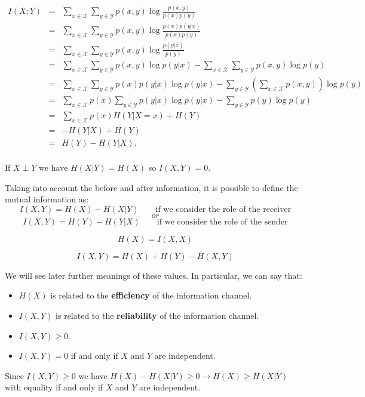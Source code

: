 \begin{equation*}
    \begin{array}{rcl}
    	I(X;Y) & = & \sum_{x \in \mathcal{X}} \sum_{y \in \mathcal{Y}} p(x,y) \log \frac{p(x,y)}{p(x)p(y)}\\[8pt]
    	& = & \sum_{x \in \mathcal{X}} \sum_{y \in \mathcal{Y}} p(x,y) \log \frac{p(x)p(y|x)}{p(x)p(y)}\\[8pt]
    	& = & \sum_{x \in \mathcal{X}} \sum_{y \in \mathcal{Y}} p(x,y) \log \frac{p(y|x)}{p(y)}\\[8pt]
    	& = & \sum_{x \in \mathcal{X}} \sum_{y \in \mathcal{Y}} p(x,y) \log{p(y|x)} - \sum_{x \in \mathcal{X}} \sum_{y \in \mathcal{Y}} p(x,y)\log{p(y)}\\[8pt]
    	& = & \sum_{x \in \mathcal{X}} \sum_{y \in \mathcal{Y}} p(x)p(y|x) \log{p(y|x)} - \sum_{y \in \mathcal{Y}} \left(\sum_{x \in \mathcal{X}} p(x, y)\right) \log{p(y)}\\[8pt]
    	& = & \sum_{x \in \mathcal{X}} p(x) \sum_{y \in \mathcal{Y}} p(y|x) \log{p(y|x)} - \sum_{y \in \mathcal{Y}} p(y) \log{p(y)}\\[8pt]
    	& = & \sum_{x \in \mathcal{X}} p(x) H(Y|X=x) + H(Y)\\[8pt]
    	& = & -H(Y|X) + H(Y)\\[8pt]
    	& = & H(Y) - H(Y|X).\\
	\end{array}
\end{equation*}

If $X \perp Y$ we have $H(X|Y) = H(X)$ so $I(X,Y) = 0$. 
\begin{thm} Taking into account the before and after information, it is possible to define the mutual information as:
	$$I(X,Y) = H(X) - H(X|Y) \qquad \text{if we consider the role of the receiver}$$
	$$or$$
	$$I(X,Y) = H(Y) - H(Y|X) \qquad \text{if we consider the role of the sender}$$
\end{thm}
\begin{thm}
	$$H(X) = I(X,X)$$
\end{thm}
\begin{thm}
	$$I(X,Y) = H(X) + H(Y) - H(X,Y)$$
\end{thm}
We will see later further meanings of these values. In particular, we can say that:
\begin{itemize}
	\item $H(X)$ is related to the \textbf{efficiency} of the information channel.
	\item $I(X,Y)$ is related to the \textbf{reliability} of the information channel.
	\item $I(X,Y) \geq 0$.
	\item $I(X,Y) = 0$ if and only if $X$ and $Y$ are independent.
\end{itemize}
Since $I(X,Y) \geq 0$ we have $H(X) - H(X|Y) \geq 0 \rightarrow H(X) \geq H(X|Y)$  with equality if and only if $X$ and $Y$ are independent.

